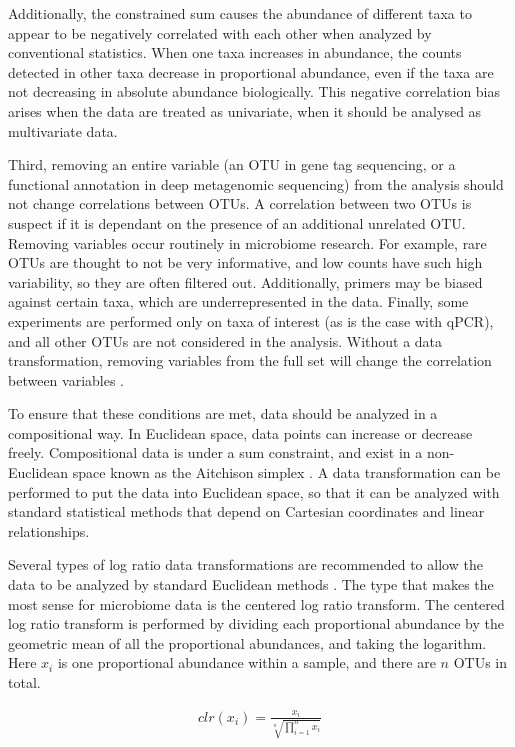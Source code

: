 Additionally, the constrained sum causes the abundance of different taxa to appear to be negatively correlated with each other when analyzed by conventional statistics. When one taxa increases in abundance, the counts detected in other taxa decrease in proportional abundance, even if the taxa are not decreasing in absolute abundance biologically. This negative correlation bias arises when the data are treated as univariate, when it should be analysed as multivariate data.

Third, removing an entire variable (an OTU in gene tag sequencing, or a functional annotation in deep metagenomic sequencing) from the analysis should not change correlations between OTUs. A correlation between two OTUs is suspect if it is dependant on the presence of an additional unrelated OTU. Removing variables occur routinely in microbiome research. For example, rare OTUs are thought to not be very informative, and low counts have such high variability, so they are often filtered out. Additionally, primers may be biased against certain taxa, which are underrepresented in the data. Finally, some experiments are performed only on taxa of interest (as is the case with qPCR), and all other OTUs are not considered in the analysis. Without a data transformation, removing variables from the full set will change the correlation between variables \cite{aitchison1982statistical}.

To ensure that these conditions are met, data should be analyzed in a compositional way. In Euclidean space, data points can increase or decrease freely. Compositional data is under a sum constraint, and exist in a non-Euclidean space known as the Aitchison simplex \cite{aitchison1982statistical}. A data transformation can be performed to put the data into Euclidean space, so that it can be analyzed with standard statistical methods that depend on Cartesian coordinates and linear relationships.

Several types of log ratio data transformations are recommended to allow the data to be analyzed by standard Euclidean methods \cite{aitchison1982statistical}. The type that makes the most sense for microbiome data is the centered log ratio transform. The centered log ratio transform is performed by dividing each proportional abundance by the geometric mean of all the proportional abundances, and taking the logarithm. Here $x_i$ is one proportional abundance within a sample, and there are $n$ OTUs in total.

\begin{align*}
clr(x_i) = \frac{x_i}{\sqrt[n]{\prod_{i=1}^{n} x_i}}
\end{align*}

